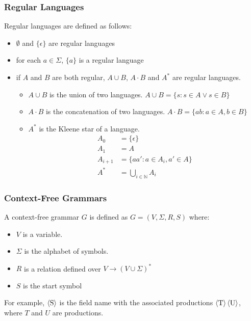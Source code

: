 \subsubsection{Regular Languages}
Regular languages are defined as follows:
\begin{multicols}{2}
\begin{itemize}
\item $\emptyset$ and $\{\epsilon\}$ are regular languages
\item for each $a\in\Sigma$, $\{a\}$ is a regular language
\item if $A$ and $B$ are both regular, $A\cup B$, $A\cdot B$ and $A^*$ are regular languages.
	\begin{itemize}
\item $A\cup B$ is the union of two languages.  $A\cup B = \{s : s\in A \lor s \in B\}$
\item $A\cdot B$ is the concatenation of two languages.  $A\cdot B = \{ ab : a \in A, b \in B\}$
\item $A^*$ is the Kleene star of a language.
\begin{align*}
    A_0&=\{\epsilon\}\\
    A_1&= A\\
    A_{i+1} &= \{ aa' : a \in A_i, a'\in A\}\\
    A^* &= \bigcup_{i\in\mathbb N} A_i
\end{align*}
	\end{itemize}
\end{itemize}
\end{multicols}

\subsubsection{Context-Free Grammars}
A context-free grammar $G$ is defined as $G=\left(V,\Sigma, R,S\right)$ where:
\begin{multicols}{2}
\begin{itemize}
\item $V$ is a variable.
\item $\Sigma$ is the alphabet of symbols.
\item $R$ is a relation defined over $V\rightarrow \left(V\cup\Sigma\right)^*$
\item $S$ is the start symbol
\end{itemize}
\end{multicols}

For example, $\langle \text S \rangle$ is the field name with the associated
productions $\langle \text T \rangle \, \langle \text U \rangle$, where $T$ and
$U$ are productions.

